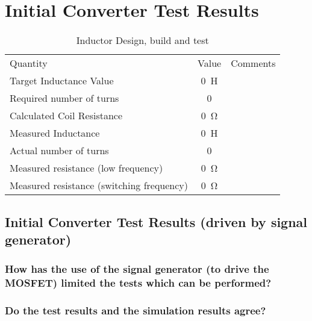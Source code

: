 \section{Initial Converter Test Results}

\begin{table}[h]
	\centering
	\caption{Inductor Design, build and test}
	\begin{tabular}{lcl}
		\toprule
		Quantity&Value&Comments\\
		\cmidrule(r){1-1}\cmidrule(lr){2-2}\cmidrule(l){3-3}
		Target Inductance Value & \SI{0}{\henry} & \\
		Required number of turns & 0 & \\
		Calculated Coil Resistance & \SI{0}{\ohm} & \\
		Measured Inductance & \SI{0}{\henry} & \\
		Actual number of turns & 0 & \\
		Measured resistance (low frequency) & \SI{0}{\ohm} & \\
		Measured resistance (switching frequency) & \SI{0}{\ohm} & \\
		\bottomrule
	\end{tabular}
\end{table}

\subsection{Initial Converter Test Results (driven by signal generator)}



\subsubsection{How has the use of the signal generator (to drive the MOSFET) limited the tests which can be performed?}

\subsubsection{Do the test results and the simulation results agree?}

